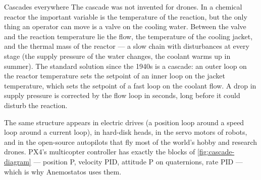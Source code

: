 \begin{curiosity}{Cascades everywhere}
The cascade was not invented for drones. In a chemical reactor the important variable is the temperature of the reaction, but the only thing an operator can move is a valve on the cooling water. Between the valve and the reaction temperature lie the flow, the temperature of the cooling jacket, and the thermal mass of the reactor — a slow chain with disturbances at every stage (the supply pressure of the water changes, the coolant warms up in summer). The standard solution since the 1940s is a cascade: an outer loop on the reactor temperature sets the setpoint of an inner loop on the jacket temperature, which sets the setpoint of a fast loop on the coolant flow. A drop in supply pressure is corrected by the flow loop in seconds, long before it could disturb the reaction.

The same structure appears in electric drives (a position loop around a speed loop around a current loop), in hard-disk heads, in the servo motors of robots, and in the open-source autopilots that fly most of the world's hobby and research drones. PX4's multicopter controller has exactly the blocks of \cref{fig:cascade-diagram} — position P, velocity PID, attitude P on quaternions, rate PID — which is why Anemostatos uses them.
\end{curiosity}

